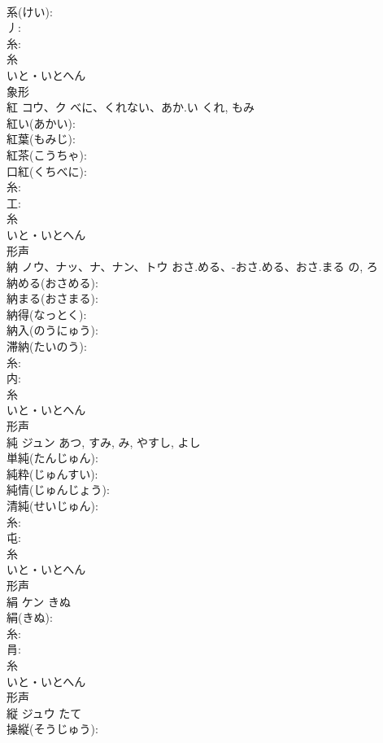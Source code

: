 \documentclass[8pt]{extreport}
\begin{document}
\begin{CJK}{UTF8}{min}
\\	系(けい): 
\\	丿: 
\\	糸: 
\\	糸	
\\	いと・いとへん	
\\	象形 
\\	紅	コウ、ク	べに、くれない、あか.い	くれ, もみ	
\\	紅い(あかい): 
\\	紅葉(もみじ): 
\\	紅茶(こうちゃ): 
\\	口紅(くちべに): 
\\	糸: 
\\	工: 
\\	糸	
\\	いと・いとへん	
\\	形声 
\\	納	ノウ、ナッ、ナ、ナン、トウ	おさ.める、-おさ.める、おさ.まる	の, ろ	
\\	納める(おさめる): 
\\	納まる(おさまる): 
\\	納得(なっとく): 
\\	納入(のうにゅう): 
\\	滞納(たいのう): 
\\	糸: 
\\	内: 
\\	糸	
\\	いと・いとへん	
\\	形声 
\\	純	ジュン		あつ, すみ, み, やすし, よし	
\\	単純(たんじゅん): 
\\	純粋(じゅんすい): 
\\	純情(じゅんじょう): 
\\	清純(せいじゅん): 
\\	糸: 
\\	屯: 
\\	糸	
\\	いと・いとへん	
\\	形声 
\\	絹	ケン	きぬ		
\\	絹(きぬ): 
\\	糸: 
\\	肙: 
\\	糸	
\\	いと・いとへん	
\\	形声 
\\	縦	ジュウ	たて		
\\	操縦(そうじゅう): 

\end{CJK}
\end{document}
